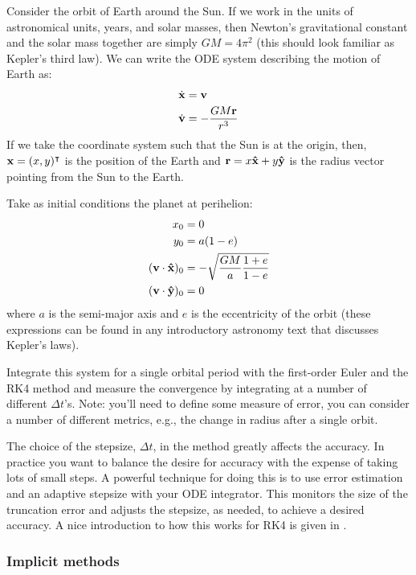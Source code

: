 \begin{exercise}
Consider the orbit of Earth around the Sun.  If we work in the units
of astronomical units, years, and solar masses, then Newton's gravitational
constant and the solar mass together are simply $G M = 4\pi^2$ (this
should look familiar as Kepler's third law).  We
can write the ODE system describing the motion of Earth as:
\begin{align}
\dot{\bf x} &= {\bf v} \\
\dot{\bf v} &= -\frac{G M {\bf r}}{r^3}
\end{align}
If we take the coordinate system such that the Sun is at the origin,
then, ${\bf x} = (x, y)^\intercal$ is the position of the Earth
and ${\bf r} = x {\bf \hat{x}} + y {\bf \hat{y}}$ is the radius
vector pointing from the Sun to the Earth.

Take as initial conditions the planet at perihelion:
\begin{align*}
x_0 &= 0 \\
y_0 &= a (1-e) \\
({\bf v}\cdot {\bf \hat{x}})_0 &= -\sqrt{\frac{GM}{a} \frac{1+e}{1-e}} \\
({\bf v}\cdot {\bf \hat{y}})_0 &= 0
\end{align*}
where $a$ is the semi-major axis and $e$ is the eccentricity of the orbit
(these expressions can be found in any introductory astronomy text that
discusses Kepler's laws).

Integrate this system for a single orbital period with the first-order
Euler and the RK4 method and measure the convergence by integrating at
a number of different $\Delta t$'s.  Note: you'll need to define some
measure of error, you can consider a number of different metrics, e.g.,
the change in radius after a single orbit.
\end{exercise}

The choice of the stepsize, $\Delta t$, in the method greatly affects
the accuracy.  In practice you want to balance the desire for accuracy
with the expense of taking lots of small steps.  A powerful technique
for doing this is to use error estimation and an adaptive stepsize with
your ODE integrator.  This monitors the size of the truncation error
and adjusts the stepsize, as needed, to achieve a desired accuracy.  A
nice introduction to how this works for RK4 is given in \cite{garcia}.

\subsubsection{Implicit methods}


